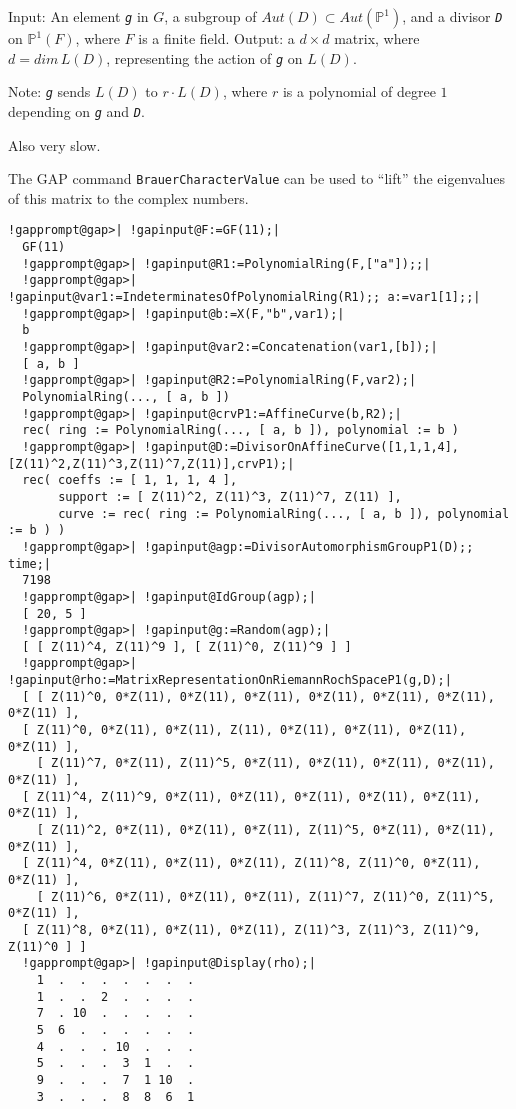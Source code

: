 \documentclass[a4paper,11pt]{report}
\begin{document}
{{{ Input: An element \mbox{\texttt{\mdseries\slshape g}} in $G$, a subgroup of $Aut(D)\subset Aut(\mathbb{P}^1)$, and a divisor \mbox{\texttt{\mdseries\slshape D}} on $\mathbb{P}^1(F)$, where $F$ is a finite field. Output: a $d\times d$ matrix, where $d = dim\, L(D)$, representing the action of \mbox{\texttt{\mdseries\slshape g}} on $L(D)$. 

 Note: \mbox{\texttt{\mdseries\slshape g}} sends $L(D)$ to $r\cdot L(D)$, where $r$ is a polynomial of degree $1$ depending on \mbox{\texttt{\mdseries\slshape g}} and \mbox{\texttt{\mdseries\slshape D}}. 

 Also very slow. 

 The GAP command \texttt{BrauerCharacterValue} can be used to ``lift'' the eigenvalues of this matrix to the complex numbers. 

 
\begin{Verbatim}[commandchars=!@|,fontsize=\small,frame=single,label=Example]
  !gapprompt@gap>| !gapinput@F:=GF(11);|
  GF(11)
  !gapprompt@gap>| !gapinput@R1:=PolynomialRing(F,["a"]);;|
  !gapprompt@gap>| !gapinput@var1:=IndeterminatesOfPolynomialRing(R1);; a:=var1[1];;|
  !gapprompt@gap>| !gapinput@b:=X(F,"b",var1);|
  b
  !gapprompt@gap>| !gapinput@var2:=Concatenation(var1,[b]);|
  [ a, b ]
  !gapprompt@gap>| !gapinput@R2:=PolynomialRing(F,var2);|
  PolynomialRing(..., [ a, b ])
  !gapprompt@gap>| !gapinput@crvP1:=AffineCurve(b,R2);|
  rec( ring := PolynomialRing(..., [ a, b ]), polynomial := b )
  !gapprompt@gap>| !gapinput@D:=DivisorOnAffineCurve([1,1,1,4],[Z(11)^2,Z(11)^3,Z(11)^7,Z(11)],crvP1);|
  rec( coeffs := [ 1, 1, 1, 4 ],  
       support := [ Z(11)^2, Z(11)^3, Z(11)^7, Z(11) ], 
       curve := rec( ring := PolynomialRing(..., [ a, b ]), polynomial := b ) )
  !gapprompt@gap>| !gapinput@agp:=DivisorAutomorphismGroupP1(D);; time;|
  7198
  !gapprompt@gap>| !gapinput@IdGroup(agp);|
  [ 20, 5 ]
  !gapprompt@gap>| !gapinput@g:=Random(agp);|
  [ [ Z(11)^4, Z(11)^9 ], [ Z(11)^0, Z(11)^9 ] ]
  !gapprompt@gap>| !gapinput@rho:=MatrixRepresentationOnRiemannRochSpaceP1(g,D);|
  [ [ Z(11)^0, 0*Z(11), 0*Z(11), 0*Z(11), 0*Z(11), 0*Z(11), 0*Z(11), 0*Z(11) ], 
  [ Z(11)^0, 0*Z(11), 0*Z(11), Z(11), 0*Z(11), 0*Z(11), 0*Z(11), 0*Z(11) ],
    [ Z(11)^7, 0*Z(11), Z(11)^5, 0*Z(11), 0*Z(11), 0*Z(11), 0*Z(11), 0*Z(11) ], 
  [ Z(11)^4, Z(11)^9, 0*Z(11), 0*Z(11), 0*Z(11), 0*Z(11), 0*Z(11), 0*Z(11) ],
    [ Z(11)^2, 0*Z(11), 0*Z(11), 0*Z(11), Z(11)^5, 0*Z(11), 0*Z(11), 0*Z(11) ], 
  [ Z(11)^4, 0*Z(11), 0*Z(11), 0*Z(11), Z(11)^8, Z(11)^0, 0*Z(11), 0*Z(11) ],
    [ Z(11)^6, 0*Z(11), 0*Z(11), 0*Z(11), Z(11)^7, Z(11)^0, Z(11)^5, 0*Z(11) ], 
  [ Z(11)^8, 0*Z(11), 0*Z(11), 0*Z(11), Z(11)^3, Z(11)^3, Z(11)^9, Z(11)^0 ] ]
  !gapprompt@gap>| !gapinput@Display(rho);|
    1  .  .  .  .  .  .  .
    1  .  .  2  .  .  .  .
    7  . 10  .  .  .  .  .
    5  6  .  .  .  .  .  .
    4  .  .  . 10  .  .  .
    5  .  .  .  3  1  .  .
    9  .  .  .  7  1 10  .
    3  .  .  .  8  8  6  1
  

\end{Verbatim}}}}
\end{document}

